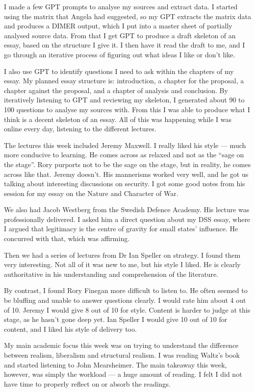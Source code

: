 I made a few GPT prompts to analyse my sources and extract data. I started using the matrix that Angela had suggested, so my GPT extracts the matrix data and produces a DIMER output, which I put into a master sheet of partially analysed source data. From that I get GPT to produce a draft skeleton of an essay, based on the structure I give it. I then have it read the draft to me, and I go through an iterative process of figuring out what ideas I like or don’t like.

I also use GPT to identify questions I need to ask within the chapters of my essay. My planned essay structure is: introduction, a chapter for the proposal, a chapter against the proposal, and a chapter of analysis and conclusion. By iteratively listening to GPT and reviewing my skeleton, I generated about 90 to 100 questions to analyse my sources with. From this I was able to produce what I think is a decent skeleton of an essay. All of this was happening while I was online every day, listening to the different lectures.

The lectures this week included Jeremy Maxwell. I really liked his style — much more conducive to learning. He comes across as relaxed and not as the “sage on the stage”. Rory purports not to be the sage on the stage, but in reality, he comes across like that. Jeremy doesn’t. His mannerisms worked very well, and he got us talking about interesting discussions on security. I got some good notes from his session for my essay on the Nature and Character of War.

We also had Jacob Westberg from the Swedish Defence Academy. His lecture was professionally delivered. I asked him a direct question about my DSS essay, where I argued that legitimacy is the centre of gravity for small states’ influence. He concurred with that, which was affirming.

Then we had a series of lectures from Dr Ian Speller on strategy. I found them very interesting. Not all of it was new to me, but his style I liked. He is clearly authoritative in his understanding and comprehension of the literature.

By contrast, I found Rory Finegan more difficult to listen to. He often seemed to be bluffing and unable to answer questions clearly. I would rate him about 4 out of 10. Jeremy I would give 8 out of 10 for style. Content is harder to judge at this stage, as he hasn’t gone deep yet. Ian Speller I would give 10 out of 10 for content, and I liked his style of delivery too.

My main academic focus this week was on trying to understand the difference between realism, liberalism and structural realism. I was reading Waltz’s book and started listening to John Mearsheimer. The main takeaway this week, however, was simply the workload — a huge amount of reading. I felt I did not have time to properly reflect on or absorb the readings.

